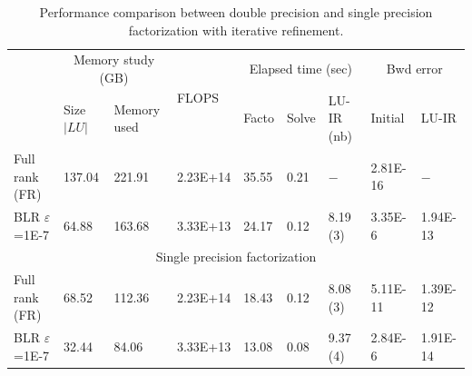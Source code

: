 \documentclass[a4paper,12pt]{article}
\begin{document}
\begin{table}[htbp]
	\centering
	\caption{Performance comparison between double precision and single precision factorization with iterative refinement.}
	\begin{center}
		\begin{tabular}{ p{1.5cm}| p{1.5cm}| p{1cm}| p{1.7cm}| p{1cm}| p{1cm}| p{1cm}| p{1.2cm}| p{1.2cm} }
			\hline
			\hline
			\multirow{2}{2em}{}    & \multicolumn{2}{c|}{Memory study (GB)} & \multirow{2}{2em}{FLOPS} & \multicolumn{3}{c|}{Elapsed time (sec)} & \multicolumn{2}{c}{Bwd error}                                            \\
			& Size $\vert LU\vert$                   & Memory used              &                                         & Facto                         & Solve & LU-IR (nb) & Initial  & LU-IR    \\
			\hline
			\hline
			Full rank (FR)         & 137.04                                 & 221.91                   & 2.23E+14                                & 35.55                         & 0.21  & $-$        & 2.81E-16 & $-$      \\
			\hline
			BLR $\varepsilon$=1E-7 & 64.88                                  & 163.68                   & 3.33E+13                                & 24.17                         & 0.12  & 8.19 (3)   & 3.35E-6  & 1.94E-13 \\
			\hline
			\multicolumn{9}{c}{Single precision factorization}                                                                                                                                                              \\
			\hline
			Full rank (FR)         & 68.52                                  & 112.36                   & 2.23E+14                                & 18.43                         & 0.12  & 8.08 (3)   & 5.11E-11 & 1.39E-12 \\
			\hline
			BLR $\varepsilon$=1E-7 & 32.44                                  & 84.06                    & 3.33E+13                                & 13.08                         & 0.08  & 9.37 (4)   & 2.84E-6  & 1.91E-14 \\
			\hline
			\hline
		\end{tabular}
	\end{center}
	\label{table:SinD-IR}
\end{table}
\end{document}
